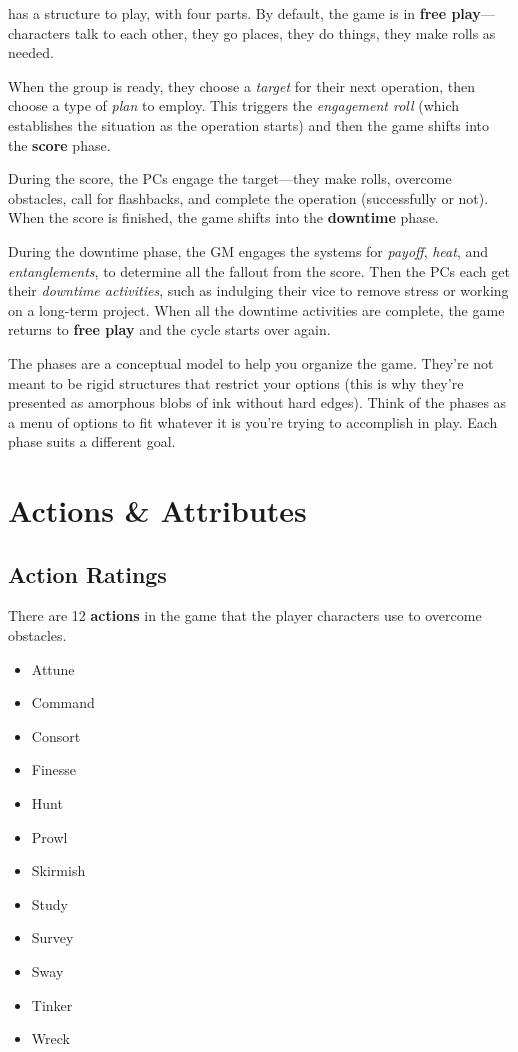 \documentclass[11pt,fleqn,a5paper]{book}
\begin{document}
\thetitle{} has a structure to play, with four parts. By default, the game is in \textbf{free play}---characters talk to each other, they go places, they do things, they make rolls as needed.

When the group is ready, they choose a \emph{target} for their next operation, then choose a type of \emph{plan} to employ. This triggers the \emph{engagement roll} (which establishes the situation as the operation starts) and then the game shifts into the \textbf{score} phase.

During the score, the PCs engage the target---they make rolls, overcome obstacles, call for flashbacks, and complete the operation (successfully or not). When the score is finished, the game shifts into the \textbf{downtime} phase.

During the downtime phase, the GM engages the systems for \emph{payoff}, \emph{heat}, and \emph{entanglements}, to determine all the fallout from the score. Then the PCs each get their \emph{downtime activities}, such as indulging their vice to remove stress or working on a long-term project. When all the downtime activities are complete, the game returns to \textbf{free play} and the cycle starts over again.

The phases are a conceptual model to help you organize the game. They’re not meant to be rigid structures that restrict your options (this is why they’re presented as amorphous blobs of ink without hard edges). Think of the phases as a menu of options to fit whatever it is you’re trying to accomplish in play. Each phase suits a different goal.

\chapter{Actions \& Attributes}

\section{Action Ratings}

There are 12 \textbf{actions} in the game that the player characters use to overcome obstacles.

\begin{itemize}
	\item Attune
	\item Command
	\item Consort
	\item Finesse
	\item Hunt
	\item Prowl
	\item Skirmish
	\item Study
	\item Survey
	\item Sway
	\item Tinker
	\item Wreck
\end{itemize}
\end{document}
